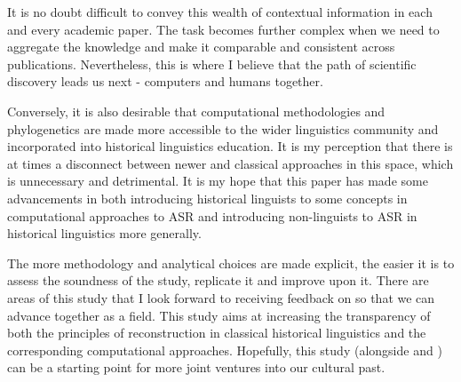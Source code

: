 \documentclass[12pt,letterpaper]{article}
\begin{document}
It is no doubt difficult to convey this wealth of contextual information in each and every academic paper. The task becomes further complex when we need to aggregate the knowledge and make it comparable and consistent across publications. Nevertheless, this is where I believe that the path of scientific discovery leads us next - computers and humans together.

Conversely, it is also desirable that computational methodologies and phylogenetics are made more accessible to the wider linguistics community and incorporated into historical linguistics education. It is my perception that there is at times a disconnect between newer and classical approaches in this space, which is unnecessary and detrimental. It is my hope that this paper has made some advancements in both introducing historical linguists to some concepts in computational approaches to ASR and introducing non-linguists to ASR in historical linguistics more generally.

The more methodology and analytical choices are made explicit, the easier it is to assess the soundness of the study, replicate it and improve upon it. There are areas of this study that I look forward to receiving feedback on so that we can advance together as a field. This study aims at increasing the transparency of both the principles of reconstruction in classical historical linguistics and the corresponding computational approaches. Hopefully, this study (alongside \citet{carling2021reconstructing} and \citet{goldstein_2022}) can be a starting point for more joint ventures into our cultural past.






\end{document}

